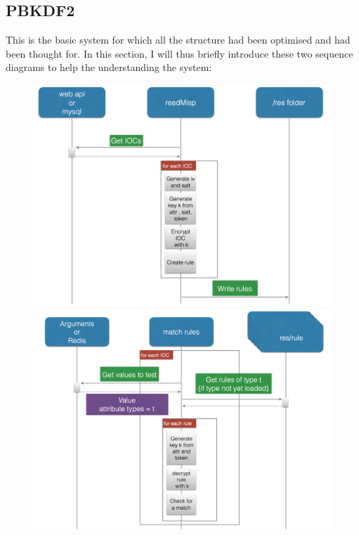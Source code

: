 \documentclass{eplmastersthesis}
\begin{document}
\subsection{PBKDF2}
This is the basic system for which all the structure had been optimised and had been thought for. In this section, I will thus briefly introduce these two sequence diagrams to help the understanding the system:
\begin{figure}[h!]
\begin{center}
   \begin{minipage}[c]{.46\linewidth}
      \includegraphics[scale=0.25]{res/seqDiagramRead}
   \end{minipage} \hfill
   \begin{minipage}[c]{.46\linewidth}
      \includegraphics[scale=0.25]{res/seqDiagramMatch}
   \end{minipage}
\end{center}
\end{figure}
\end{document}
